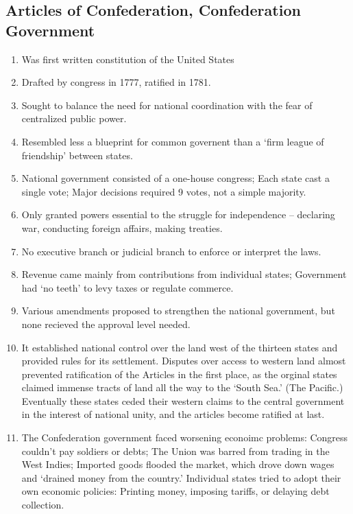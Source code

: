 \documentclass{article}
\begin{document}
    \subsection{Articles of Confederation, Confederation Government}
    \begin{enumerate}
      \item Was first written constitution of the United States
      \item Drafted by congress in 1777, ratified in 1781.
      \item Sought to balance the need for national coordination with the fear of centralized public power.
      \item Resembled less a blueprint for common governent than a `firm league of friendship' between states.
      \item National government consisted of a one-house congress; Each state cast a single vote; Major decisions required 9 votes, not a simple majority.
      \item Only granted powers essential to the struggle for independence -- declaring war, conducting foreign affairs, making treaties.
      \item No executive branch or judicial branch to enforce or interpret the laws.
      \item Revenue came mainly from contributions from individual states; Government had `no teeth' to levy taxes or regulate commerce.
      \item Various amendments proposed to strengthen the national government, but none recieved the approval level needed.
      \item  It established national control over the land west of the thirteen states and provided rules for its settlement. Disputes over access to western land almost prevented ratification of the Articles in the first place, as the orginal states claimed immense tracts of land all the way to the `South Sea.' (The Pacific.) Eventually these states ceded their western claims to the central government in the interest of national unity, and the articles become ratified at last.
      \item The Confederation government faced worsening econoimc problems: Congress couldn't pay soldiers or debts; The Union was barred from trading in the West Indies; Imported goods flooded the market, which drove down wages and `drained money from the country.' Individual states tried to adopt their own economic policies: Printing money, imposing tariffs, or delaying debt collection. 
    \end{enumerate}
\end{document}
